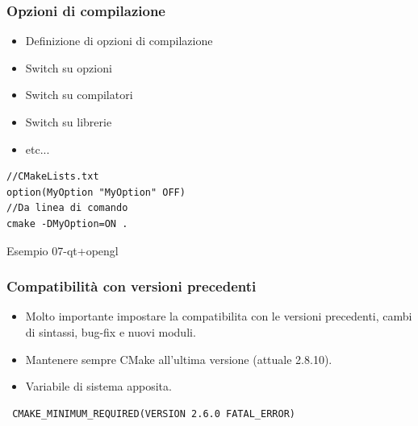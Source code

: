 \documentclass[10pt] {beamer}
\begin{document}

\begin{frame}[fragile]
\frametitle{Opzioni di compilazione}
\begin{itemize}
 \item Definizione di opzioni di compilazione
 \item Switch su opzioni
 \item Switch su compilatori
 \item Switch su librerie
 \item etc...
\end{itemize}

\begin{verbatim}
//CMakeLists.txt
option(MyOption "MyOption" OFF)
//Da linea di comando
cmake -DMyOption=ON .
\end{verbatim}

Esempio 07-qt+opengl
\end{frame}



\begin{frame}[fragile]
\frametitle{Compatibilità con versioni precedenti}
\begin{itemize}
\item Molto importante impostare la compatibilita con le versioni precedenti, cambi di sintassi, bug-fix e nuovi moduli.
\item Mantenere sempre CMake all'ultima versione (attuale 2.8.10).
\item Variabile di sistema apposita.
\end{itemize}
\begin{verbatim}
 CMAKE_MINIMUM_REQUIRED(VERSION 2.6.0 FATAL_ERROR)
\end{verbatim}
\end{frame}

\end{document}
